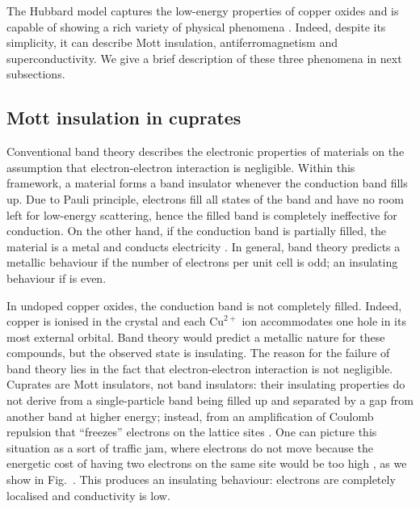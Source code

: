 The Hubbard model captures the low-energy properties of copper oxides \cite{zhang1988renormalised,lee2006doping} and is capable of showing a rich variety of physical phenomena \cite{scalapino2012common,arovas2022hubbard}. Indeed, despite its simplicity, it can describe Mott insulation, antiferromagnetism and superconductivity. We give a brief description of these three phenomena in next subsections.

\subsection{Mott insulation in cuprates}\label{subsec:mott-cuprates}

Conventional band theory describes the electronic properties of materials on the assumption that electron-electron interaction is negligible. Within this framework, a material forms a band insulator whenever the conduction band fills up. Due to Pauli principle, electrons fill all states of the band and have no room left for low-energy scattering, hence the filled band is completely ineffective for conduction. On the other hand, if the conduction band is partially filled, the material is a metal and conducts electricity \cite{grosso2014solid}. In general, band theory predicts a metallic behaviour if the number of electrons per unit cell is odd; an insulating behaviour if is even.

In undoped copper oxides, the conduction band is not completely filled. Indeed, copper is ionised in the crystal and each $\mathrm{Cu}^{2+}$ ion accommodates one hole in its most external orbital. Band theory would predict a metallic nature for these compounds, but the observed state is insulating. The reason for the failure of band theory lies in the fact that electron-electron interaction is not negligible. Cuprates are Mott insulators, not band insulators: their insulating properties do not derive from a single-particle band being filled up and separated by a gap from another band at higher energy; instead, from an amplification of Coulomb repulsion that ``freezes'' electrons on the lattice sites \cite{keimer2015quantum}. One can picture this situation as a sort of traffic jam, where electrons do not move because the energetic cost of having two electrons on the same site would be too high \cite{zaanen2007watching}, as we show in Fig.~\mref. This produces an insulating behaviour: electrons are completely localised and conductivity is low.

%	

